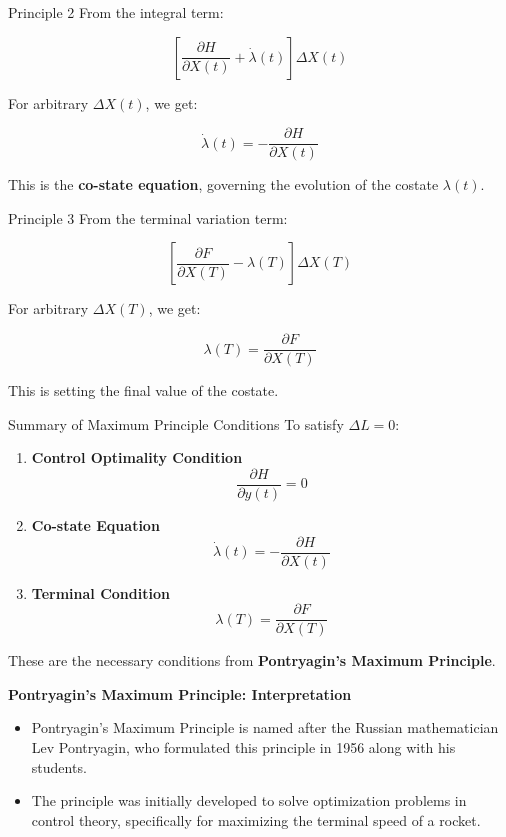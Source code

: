 \documentclass[
  ignorenonframetext,
]{beamer}
\providecommand{\tightlist}{%
  \setlength{\itemsep}{0pt}\setlength{\parskip}{0pt}}\usepackage{longtable,booktabs,array}
\begin{document}
\begin{frame}{Principle 2}
\label{principle-2}
From the integral term:

\[
\left[\frac{\partial H}{\partial X(t)} + \dot{\lambda}(t)\right] \Delta X(t)
\]

For arbitrary \(\Delta X(t)\), we get:

\[
\dot{\lambda}(t) = -\frac{\partial H}{\partial X(t)}
\]

This is the \textbf{co-state equation}, governing the evolution of the
costate \(\lambda(t)\).
\end{frame}

\begin{frame}{Principle 3}
\label{principle-3}
From the terminal variation term:

\[
\left[\frac{\partial F}{\partial X(T)} - \lambda(T)\right] \Delta X(T)
\]

For arbitrary \(\Delta X(T)\), we get:

\[
\lambda(T) = \frac{\partial F}{\partial X(T)}
\]

This is setting the final value of the costate.
\end{frame}

\begin{frame}{Summary of Maximum Principle Conditions}
\label{summary-of-maximum-principle-conditions}
To satisfy \(\Delta L = 0\):

\begin{enumerate}
\item
  \textbf{Control Optimality Condition}\\
  \[\frac{\partial H}{\partial y(t)} = 0\]
\item
  \textbf{Co-state Equation}\\
  \[\dot{\lambda}(t) = -\frac{\partial H}{\partial X(t)}\]
\item
  \textbf{Terminal Condition}\\
  \[\lambda(T) = \frac{\partial F}{\partial X(T)}\]
\end{enumerate}

These are the necessary conditions from \textbf{Pontryagin's Maximum
Principle}.
\end{frame}

\begin{frame}{\textbf{Pontryagin's Maximum Principle: Interpretation}}
\label{pontryagins-maximum-principle-interpretation}
\begin{itemize}
\tightlist
\item
  Pontryagin's Maximum Principle is named after the Russian
  mathematician Lev Pontryagin, who formulated this principle in 1956
  along with his students.
\item
  The principle was initially developed to solve optimization problems
  in control theory, specifically for maximizing the terminal speed of a
  rocket.
\end{itemize}
\end{frame}
\end{document}
